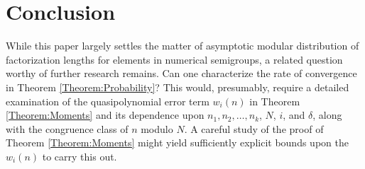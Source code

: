 \documentclass[10pt,reqno]{amsart}
\newcommand{\0}{\color{lightgray}0}
\renewcommand\>{\rangle}
\newcommand\<{\langle}
\theoremstyle{plain}
\theoremstyle{definition}
\newcounter{question}
\begin{document}
\section{Conclusion}\label{Section:Conclusion}
While this paper largely settles the matter of asymptotic modular distribution of factorization lengths 
for elements in numerical semigroups, a related question worthy of further research remains.
Can one characterize the rate of convergence in Theorem \ref{Theorem:Probability}?
This would, presumably, require a detailed examination of the quasipolynomial error term $w_i(n)$ 
in Theorem \ref{Theorem:Moments}
and its dependence upon $n_1,n_2,\ldots,n_k$, $N$, $i$, and $\delta$, along with the congruence class of $n$
modulo $N$.  
A careful study of the proof of Theorem \ref{Theorem:Moments}
might yield sufficiently explicit bounds upon the $w_i(n)$ to carry this out.




\end{document}
